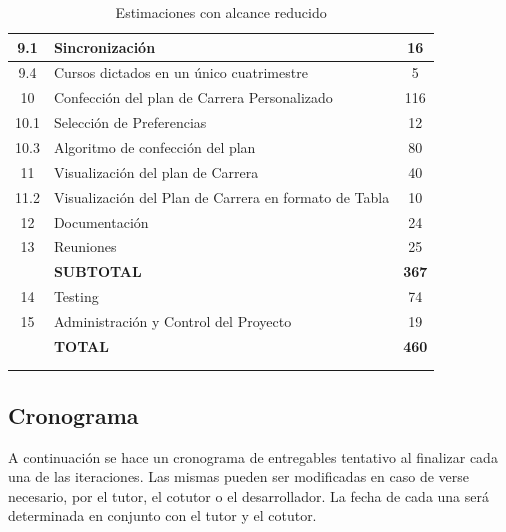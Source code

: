 \documentclass[a4paper]{article}
\begin{document}
\begin{longtable}{| c | l | c |}
\hline
9.1					&	Sincronización													&	16\\
\hline
9.4					&	Cursos dictados en un único cuatrimestre						&	5\\
\hline
10					&	Confección del plan de Carrera Personalizado					&	116\\
\hline
10.1				&	Selección de Preferencias										&	12\\
\hline
10.3				&	Algoritmo de confección del plan								&	80\\
\hline
11					&	Visualización del plan de Carrera								&	40\\
\hline
11.2				&	Visualización del Plan de Carrera en formato de Tabla			&	10\\
\hline
12					&	Documentación													&	24\\
\hline
13					&	Reuniones														&	25\\
\hline
					&	\textbf{SUBTOTAL}												&	\textbf{367}\\
\hline
14					&	Testing															&	74\\
\hline
15					&	Administración y Control del Proyecto							&	19\\
\hline
					&	\textbf{TOTAL}													&	\textbf{460}\\
\hline
\\ %
\caption{Estimaciones con alcance reducido}
\label{ta:estimaciones_alcance_reducido}
\end{longtable}

\newpage

\subsection{Cronograma}

A continuación se hace un cronograma de entregables tentativo al finalizar cada una de las iteraciones. Las mismas pueden ser modificadas en caso de verse necesario, por el tutor, el cotutor o el desarrollador. La fecha de cada una será determinada en conjunto con el tutor y el cotutor.
\end{document}
